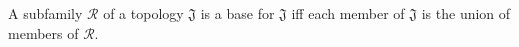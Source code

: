 A subfamily $\mathscr{R}$ of a topology $\mathfrak{J}$ is a base for $\mathfrak{J}$ iff each member of $\mathfrak{J}$ is the union of members of $\mathscr{R}$.
